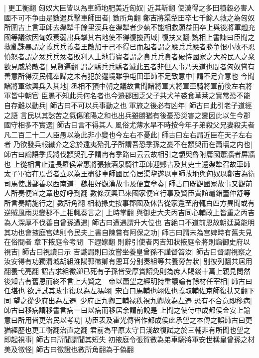 |{
	更工衡翻}
匈奴大臣皆以為車師地肥美近匈奴|{
	近其靳翻}
使漢得之多田積穀必害人國不可不争由是數遣兵擊車師田者|{
	數所角翻}
鄭吉將渠犁田卒七千餘人救之為匈奴所圍吉上言車師去渠犁千餘里漢兵在渠犁者少埶不能相救願益田卒上與後將軍趙充國等議欲因匈奴衰弱出兵擊其右地使不得復擾西域|{
	復扶又翻}
魏相上書諫曰臣聞之救亂誅暴謂之義兵兵義者王敵加于己不得已而起者謂之應兵兵應者勝争恨小故不忍憤怒者謂之忿兵兵忿者敗利人土地貨寶者謂之貪兵兵貪者破恃國家之大矜民人之衆欲見威於敵者|{
	見賢遍翻}
謂之驕兵兵驕者滅此五者非但人事乃天道也間者匈奴嘗有善意所得漢民輒奉歸之未有犯於邉境雖爭屯田車師不足致意中|{
	謂不足介意也}
今聞諸將軍欲興兵入其地|{
	丞相不預中朝之議故言聞諸將軍大將軍車騎將軍前後左右將軍皆中朝官}
臣愚不知此兵何名者也今邉郡困乏父子共犬羊裘食草莱之實常恐不能自存難以動兵|{
	師古曰不可以兵事動之也}
軍旅之後必有凶年|{
	師古曰此引老子道經之語}
言民以其愁苦之氣傷隂陽之和也出兵雖勝猶有後憂恐災害之變因此以生今郡國守相多不實選|{
	師古曰言不得其人}
風俗尤薄水旱不時按今年子弟殺父兄妻殺夫者凡二百二十二人臣愚以為此非小變也今左右不憂此|{
	師古曰左右謂近臣在天子左右者}
乃欲發兵報纎介之忿於遠夷殆孔子所謂吾恐季孫之憂不在顓臾而在蕭墻之内也|{
	師古曰論語季氏將伐顓臾孔子謂冉有季路曰云云故相引之顓臾魯附庸國蕭牆者屏牆也}
上從相言止遣長羅侯常惠將張掖酒泉騎往車師迎鄭吉及其吏士還渠犂召故車師太子軍宿在焉耆者立以為王盡徙車師國民令居渠犂遂以車師故地與匈奴以鄭吉為衛司馬使護鄯善以西南道　魏相好觀漢故事及便宜章奏|{
	師古曰既觀國家故事又觀前人所奏便宜之章也好呼到翻}
數條漢興已來國家便宜行事及賢臣賈誼鼂錯董仲舒等所言奏請施行之|{
	數所角翻}
相勑掾史按事郡國及休告從家還至府輒白四方異聞或有逆賊風雨災變郡不上相輒奏言之|{
	上時掌翻}
與御史大夫丙吉同心輔政上皆重之丙吉為人深厚不伐善自曾孫遭遇|{
	師古曰遭遇謂升大位也}
吉絶口不道前恩故朝廷莫能明其功也會掖庭宫婢則令民夫上書自陳嘗有阿保之功|{
	師古曰謂未為宫婢時有舊夫見在俗間者}
章下掖庭令考問|{
	下遐嫁翻}
則辭引使者丙吉知狀掖庭令將則詣御史府以視吉|{
	師古曰視讀曰示}
吉識謂則曰汝嘗坐養皇曾孫不謹督笞汝|{
	師古曰督謂視察之}
汝安得有功獨渭城胡組淮陽郭徵卿有恩耳分别奏組等共養勞苦狀|{
	别彼列翻共居用翻養弋亮翻}
詔吉求組徵卿已死有子孫皆受厚賞詔免則為庶人賜錢十萬上親見問然後知吉有舊恩而終不言上大賢之　帝以蕭望之經明持重議論有餘材任宰相|{
	師古曰任堪也}
欲詳試其政事復以為左馮翊|{
	宋白曰馬輔也翊佐也義取輔佐京師復扶又翻下同}
望之從少府出為左遷|{
	少府正九卿三輔禄秩視九卿故為左遷}
恐有不合意即移病|{
	師古曰移病謂移書言病一曰以病而移居余謂前說是}
上聞之使侍中成都侯金安上諭意曰所用皆更治民以考功|{
	功臣表及霍光傳皆作都成侯此承望之本傳之誤師古曰更猶經歷也更工衡翻治直之翻}
君前為平原太守日淺故復試之於三輔非有所聞也望之即起視事|{
	師古曰所聞謂聞其短失}
初掖庭令張賀數為弟車騎將軍安世稱皇曾孫之材美及徵怪|{
	師古曰徵證也數所角翻為于偽翻}
